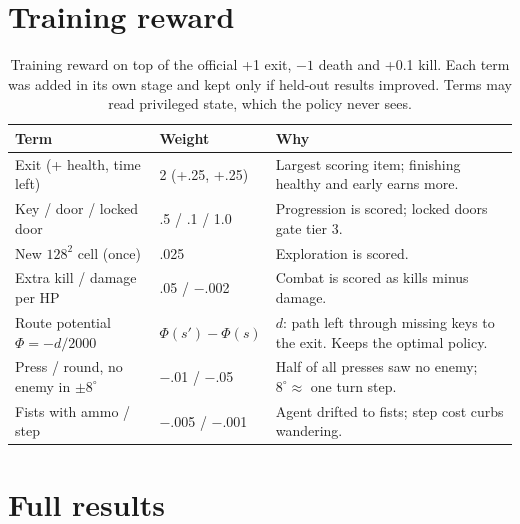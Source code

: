 \documentclass{article}
\begin{document}
{\small

}

\appendix
\section{Training reward}\label{app:reward}
\begin{table}[H]
\centering\footnotesize
\caption{Training reward on top of the official +1 exit, $-1$ death and +0.1 kill. Each term was added in its own stage and kept only if held-out results improved. Terms may read privileged state, which the policy never sees.}
\label{tab:reward}
\setlength{\tabcolsep}{3.5pt}
\begin{tabularx}{\linewidth}{@{}l l X@{}}
\toprule
Term & Weight & Why \\
\midrule
Exit (+ health, time left) & 2 (+.25, +.25) & Largest scoring item; finishing healthy and early earns more. \\
Key / door / locked door & .5 / .1 / 1.0 & Progression is scored; locked doors gate tier 3. \\
New $128^2$ cell (once) & .025 & Exploration is scored. \\
Extra kill / damage per HP & .05 / $-$.002 & Combat is scored as kills minus damage. \\
Route potential $\Phi=-d/2000$ & $\Phi(s')-\Phi(s)$ & $d$: path left through missing keys to the exit. Keeps the optimal policy. \\
Press / round, no enemy in $\pm8^\circ$ & $-$.01 / $-$.05 & Half of all presses saw no enemy; $8^\circ\approx$ one turn step. \\
Fists with ammo / step & $-$.005 / $-$.001 & Agent drifted to fists; step cost curbs wandering. \\
\bottomrule
\end{tabularx}
\end{table}

\section{Full results}\label{app:results}
\end{document}
